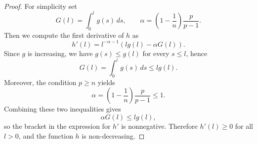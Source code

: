 \documentclass[12pt]{article}
\theoremstyle{definition}
\theoremstyle{plain}
\theoremstyle{definition}
\begin{document}
\begin{proof}
For simplicity set
\begin{equation*}
G(l)=\int_{0}^l g(s)\,ds, \qquad
\alpha=\left(1-\frac{1}{n}\right)\frac{p}{p-1}.
\end{equation*}
Then we compute the first derivative of $h$ as
\begin{equation*}
h'(l)
= l^{-\alpha-1}\left(l g(l)-\alpha G(l)\right).
\end{equation*}
Since $g$ is increasing, we have $g(s)\le g(l)$ for every $s\leq l$, hence
\begin{equation*}
G(l)=\int_0^l g(s)\,ds \le lg(l).
\end{equation*}
Moreover, the condition $p\geq n$ yields
\begin{equation*}
\alpha=\left(1-\frac1n\right)\frac{p}{p-1}\leq 1.
\end{equation*}
Combining these two inequalities gives
\begin{equation*}
\alpha G(l)\leq lg(l),
\end{equation*}
so the bracket in the expression for $h'$ is nonnegative. Therefore $h'(l)\geq0$ for all $l>0$, and the function $h$ is non-decreasing.
\end{proof}
\end{document}
